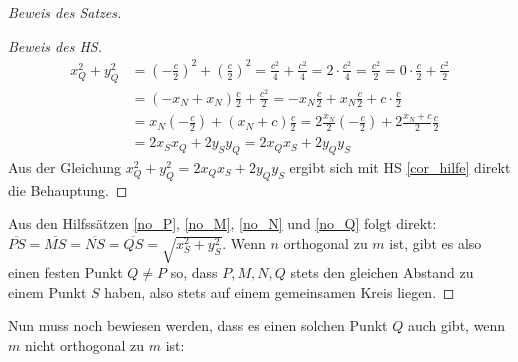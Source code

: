 \begin{proof}[Beweis des Satzes]
\begin{proof}[Beweis des HS]
        \begin{align*}
            x_Q^2+y_Q^2&=\left(-\frac{c}{2}\right)^2+\left(\frac{c}{2}\right)^2=\frac{c^2}{4}+\frac{c^2}{4}
            =2\cdot \frac{c^2}{4}=\frac{c^2}{2}=0\cdot \frac{c}{2}+\frac{c^2}{2}\\
            &=(-x_N+x_N)\frac{c}{2}+\frac{c^2}{2}=-x_N\frac{c}{2}+x_N\frac{c}{2}+c\cdot\frac{c}{2}\\
            &=x_N\left(-\frac{c}{2}\right)+(x_N+c)\frac{c}{2}=2\frac{x_N}{2}
            \left(-\frac{c}{2}\right)+2\frac{x_N+c}{2}\frac{c}{2}\\
            &=2x_Sx_Q+2y_Sy_Q=2x_Qx_S+2y_Qy_S
        \end{align*}
        Aus der Gleichung $x_Q^2+y_Q^2=2x_Qx_S+2y_Qy_S$ ergibt sich mit HS \ref{cor_hilfe} direkt die Behauptung.
    \end{proof}
    Aus den Hilfssätzen \ref{no_P}, \ref{no_M}, \ref{no_N} und \ref{no_Q} folgt direkt: 
    $\overline{PS}=\overline{MS}=\overline{NS}=\overline{QS}=\sqrt{x_S^2+y_S^2}$. Wenn $n$ orthogonal zu $m$ ist, 
    gibt es also einen festen Punkt $Q\neq P$ so, dass $P,M,N,Q$ stets den gleichen Abstand zu einem Punkt $S$ haben, 
    also stets auf einem gemeinsamen Kreis liegen.
    \renewcommand{\qedsymbol}{$\blacksquare$}
\end{proof}

Nun muss noch bewiesen werden, dass es einen solchen Punkt $Q$ auch gibt, wenn $m$ nicht orthogonal zu $m$ ist:

